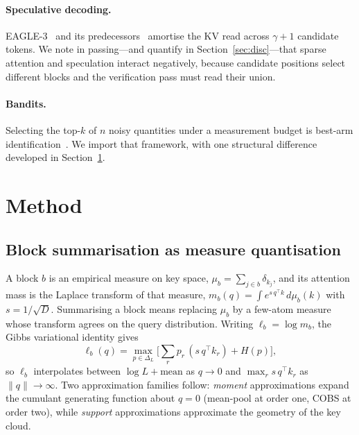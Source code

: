 \documentclass[sigconf,nonacm,11pt]{acmart}
\begin{document}
\paragraph{Speculative decoding.} EAGLE-3~\cite{li2025eagle3} and its
predecessors~\cite{leviathan2023speculative} amortise the KV read across
$\gamma+1$ candidate tokens. We note in passing---and quantify in
Section~\ref{sec:disc}---that sparse attention and speculation interact
negatively, because candidate positions select different blocks and the
verification pass must read their union.

\paragraph{Bandits.} Selecting the top-$k$ of $n$ noisy quantities under a
measurement budget is best-arm identification~\cite{bubeck2009pure,%
carpentier2016tight,karnin2013almost}. We import that framework, with one
structural difference developed in Section~\ref{sec:method}.

\section{Method}\label{sec:method}

\subsection{Block summarisation as measure quantisation}

A block $b$ is an empirical measure on key space, $\mu_b=\sum_{j\in b}\delta_{k_j}$,
and its attention mass is the Laplace transform of that measure,
$m_b(q)=\int e^{s\,q^\top k}\,d\mu_b(k)$ with $s=1/\sqrt{D}$. Summarising a block
means replacing $\mu_b$ by a few-atom measure whose transform agrees on the query
distribution. Writing $\ell_b=\log m_b$, the Gibbs variational identity gives
\begin{equation}
\ell_b(q)=\max_{p\in\Delta_L}\Big[\textstyle\sum_r p_r\,(s\,q^\top k_r)+H(p)\Big],
\end{equation}
so $\ell_b$ interpolates between $\log L+\text{mean}$ as $q\to 0$ and
$\max_r s\,q^\top k_r$ as $\|q\|\to\infty$. Two approximation families follow:
\emph{moment} approximations expand the cumulant generating function about $q=0$
(mean-pool at order one, COBS at order two), while \emph{support} approximations
approximate the geometry of the key cloud.
\end{document}
